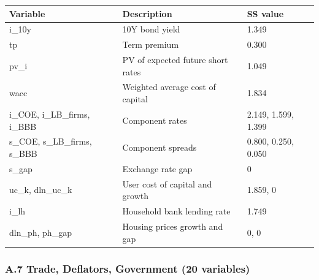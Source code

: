 \documentclass[
]{article}
\newcounter{none} %
\begin{document}
{\def\LTcaptype{none} %
\begin{longtable}[]{@{}lll@{}}
\toprule\noalign{}
Variable & Description & SS value \\
\midrule\noalign{}
\endhead
\bottomrule\noalign{}
\endlastfoot
i\_10y & 10Y bond yield & 1.349 \\
tp & Term premium & 0.300 \\
pv\_i & PV of expected future short rates & 1.049 \\
wacc & Weighted average cost of capital & 1.834 \\
i\_COE, i\_LB\_firms, i\_BBB & Component rates & 2.149, 1.599, 1.399 \\
s\_COE, s\_LB\_firms, s\_BBB & Component spreads & 0.800, 0.250,
0.050 \\
s\_gap & Exchange rate gap & 0 \\
uc\_k, dln\_uc\_k & User cost of capital and growth & 1.859, 0 \\
i\_lh & Household bank lending rate & 1.749 \\
dln\_ph, ph\_gap & Housing prices growth and gap & 0, 0 \\
\end{longtable}
}

\subsubsection{A.7 Trade, Deflators, Government (20
variables)}\label{a.7-trade-deflators-government-20-variables}
\end{document}
